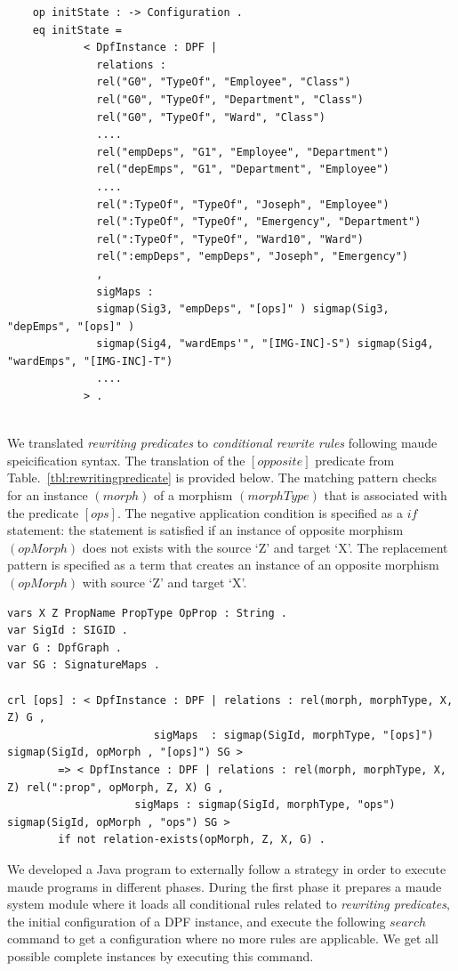 \documentclass{eceasst}
\begin{document}
\tiny
\begin{verbatim}
	op initState : -> Configuration .
	eq initState = 
			< DpfInstance : DPF | 
			  relations : 
			  rel("G0", "TypeOf", "Employee", "Class")
			  rel("G0", "TypeOf", "Department", "Class")
			  rel("G0", "TypeOf", "Ward", "Class")			  
			  ....
			  rel("empDeps", "G1", "Employee", "Department")
			  rel("depEmps", "G1", "Department", "Employee")
			  ....			  
			  rel(":TypeOf", "TypeOf", "Joseph", "Employee") 
			  rel(":TypeOf", "TypeOf", "Emergency", "Department") 
			  rel(":TypeOf", "TypeOf", "Ward10", "Ward") 			  
			  rel(":empDeps", "empDeps", "Joseph", "Emergency") 			  
			  ,
			  sigMaps : 
			  sigmap(Sig3, "empDeps", "[ops]" ) sigmap(Sig3, "depEmps", "[ops]" )
			  sigmap(Sig4, "wardEmps'", "[IMG-INC]-S") sigmap(Sig4, "wardEmps", "[IMG-INC]-T")
			  ....
			> .
 
\end{verbatim}
\normalsize

We translated \textit{rewriting predicates} to \textit{conditional rewrite rules} following maude speicification syntax. 
The translation of the $[opposite]$ predicate from Table.~\ref{tbl:rewritingpredicate} is provided below. 
The matching pattern checks for an instance $(morph)$ of a morphism $(morphType)$ that is associated with the predicate $[ops]$. 
The negative application condition is specified as a $if$ statement: the statement is satisfied if an instance of opposite morphism $(opMorph)$ does not exists with the source `Z' and target `X'. 
The replacement pattern is specified as a term that creates an instance of an opposite morphism $(opMorph)$ with source `Z' and target `X'. 

\tiny
\begin{verbatim}
vars X Z PropName PropType OpProp : String .
var SigId : SIGID .
var G : DpfGraph .
var SG : SignatureMaps .

crl [ops] :	< DpfInstance : DPF | relations : rel(morph, morphType, X, Z) G , 
				       sigMaps  : sigmap(SigId, morphType, "[ops]") sigmap(SigId, opMorph , "[ops]") SG > 
		=> < DpfInstance : DPF | relations : rel(morph, morphType, X, Z) rel(":prop", opMorph, Z, X) G , 
					sigMaps : sigmap(SigId, morphType, "ops") sigmap(SigId, opMorph , "ops") SG > 
		if not relation-exists(opMorph, Z, X, G) .
\end{verbatim}
\normalsize

We developed a Java program to externally follow a strategy in order to execute maude programs in different phases. 
During the first phase it prepares a maude system module where it loads all conditional rules related to  \textit{rewriting predicates}, the initial configuration of a DPF instance, 
and execute the following $search$ command to get a configuration where no more rules are applicable. 
We get all possible complete instances by executing this command.
\end{document}
